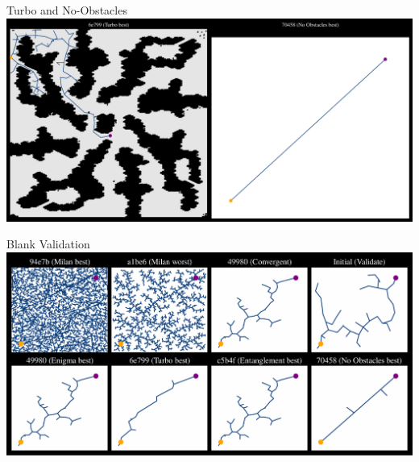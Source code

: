 \documentclass[aspectratio=169]{beamer}
\begin{document}
\begin{frame}{Turbo and No-Obstacles}
    \includegraphics[width=1.0\linewidth, keepaspectratio]{figures/learned_split_3.pdf}
\end{frame}


\begin{frame}{Blank Validation}
    \includegraphics[width=1.0\linewidth, keepaspectratio]{figures/blank_val.pdf}
\end{frame}

% 
\end{document}
